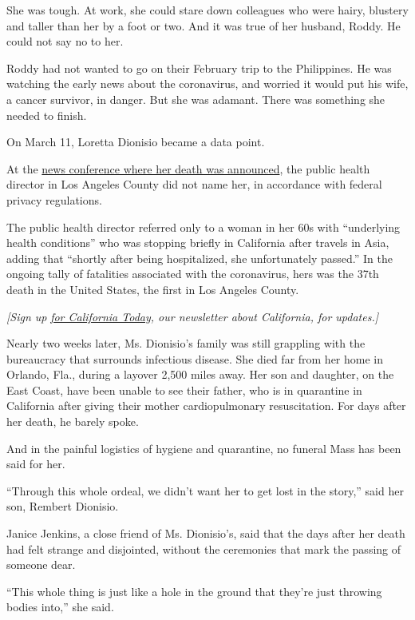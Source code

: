 She was tough. At work, she could stare down colleagues who were hairy,
blustery and taller than her by a foot or two. And it was true of her
husband, Roddy. He could not say no to her.

Roddy had not wanted to go on their February trip to the Philippines. He
was watching the early news about the coronavirus, and worried it would
put his wife, a cancer survivor, in danger. But she was adamant. There
was something she needed to finish.

On March 11, Loretta Dionisio became a data point.

At the
\href{https://www.dailybreeze.com/2020/03/11/la-county-reports-first-death-related-to-coronavirus-6-new-cases/}{news
conference where her death was announced}, the public health director in
Los Angeles County did not name her, in accordance with federal privacy
regulations.

The public health director referred only to a woman in her 60s with
``underlying health conditions'' who was stopping briefly in California
after travels in Asia, adding that ``shortly after being hospitalized,
she unfortunately passed.'' In the ongoing tally of fatalities
associated with the coronavirus, hers was the 37th death in the United
States, the first in Los Angeles County.

\emph{{[}Sign up}
\href{https://www.nytimes3xbfgragh.onion/newsletters/california-today}{\emph{for
California Today}}\emph{, our newsletter about California, for
updates.{]}}

Nearly two weeks later, Ms. Dionisio's family was still grappling with
the bureaucracy that surrounds infectious disease. She died far from her
home in Orlando, Fla., during a layover 2,500 miles away. Her son and
daughter, on the East Coast, have been unable to see their father, who
is in quarantine in California after giving their mother cardiopulmonary
resuscitation. For days after her death, he barely spoke.

And in the painful logistics of hygiene and quarantine, no funeral Mass
has been said for her.

``Through this whole ordeal, we didn't want her to get lost in the
story,'' said her son, Rembert Dionisio.

Janice Jenkins, a close friend of Ms. Dionisio's, said that the days
after her death had felt strange and disjointed, without the ceremonies
that mark the passing of someone dear.

``This whole thing is just like a hole in the ground that they're just
throwing bodies into,'' she said.

